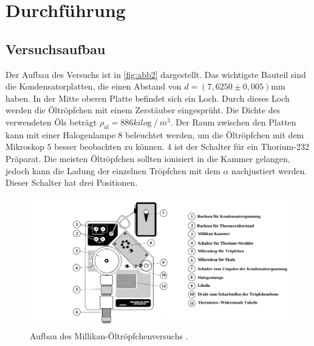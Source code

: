 \section{Durchführung}
\label{sec:Durchführung}

\subsection{Versuchsaufbau}
Der Aufbau des Versuchs ist in \autoref{fig:abb2} dargestellt. Das wichtigste Bauteil sind die Kondensatorplatten, die einen Abstand von $d = (7,6250 \pm 0,005) \unit{\milli\meter}$ haben.
In der Mitte oberen Platte befindet sich ein Loch. Durch dieses Loch werden die Öltröpfchen mit einem Zerstäuber eingesprüht.
Die Dichte des verwendeten Öls beträgt $\rho_{öl} = 886 \unit{kilo\gram} \mathbin{/} m^3$. Der Raum zwischen den Platten kann mit einer Halogenlampe $8$ beleuchtet werden, um die Öltröpfchen mit dem Mikroskop $5$ besser beobachten zu können.
$4$ ist der Schalter für ein Thorium-232 Prä­pa­rat. Die meisten Öltröpfchen sollten ionisiert in die Kammer gelangen, jedoch kann die Ladung der einzelnen Tröpfchen mit dem $\alpha$ nachjustiert werden. Dieser Schalter hat drei Positionen.



\begin{figure}[H]
    \centering
    \includegraphics{figures/Abb2.pdf}
    \caption{Aufbau des Millikan-Öltröpfchenversuchs \cite{ap12}.}
    \label{fig:abb2}
\end{figure}